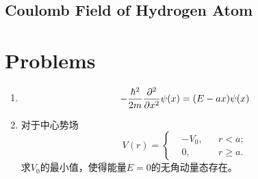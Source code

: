 \subsection{Coulomb Field of Hydrogen Atom}

\newpage 
\section*{Problems}
\begin{enumerate}
    \item \begin{equation}
        -\frac{\hbar^2}{2m}\frac{\partial^2 }{\partial x^2}\psi(x)=(E-ax)\psi(x)
    \end{equation}
    \item 对于中心势场
    \begin{equation}
        V(r)=\left\lbrace
        \begin{aligned}
            &-V_0, && r<a;\\
            &0, && r\ge a.
        \end{aligned}\right.
    \end{equation}
    求$V_0$的最小值，使得能量$E=0$的无角动量态存在。
\end{enumerate}

\newpage
